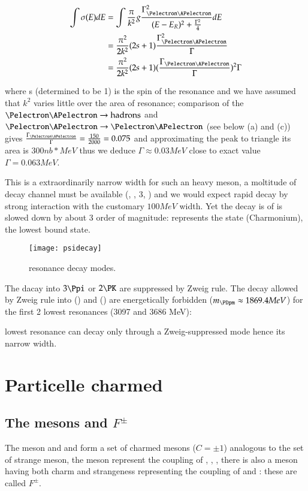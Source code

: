 \documentclass[main.tex]{subfiles}
\begin{document}
\begin{align*}
\int\sigma(E)dE&=\int\frac{\pi}{k^2}g\frac{\Gamma_{\Pelectron\APelectron}^2}{(E-E_R)^2+\frac{\Gamma^2}{4}}dE \\
&=\frac{\pi^2}{2k^2}(2s+1)\frac{\Gamma_{\Pelectron\APelectron}^2}{\Gamma}\\
&=\frac{\pi^2}{2k^2}(2s+1)(\frac{\Gamma_{\Pelectron\APelectron}}{\Gamma})^2\Gamma
\end{align*}

where s (determined to be 1) is the spin of the resonance and we have assumed that $k^2$ varies little over the area of resonance; comparison of the $\Pelectron\APelectron\rightarrow\text{hadrons}$ and $\Pelectron\APelectron\rightarrow\Pelectron\APelectron$ (see below (a) and (c)) gives $\frac{\Gamma_{\Pelectron\APelectron}}{\Gamma}=\frac{150}{2000}=0.075$ and approximating the peak to triangle its area is $300 nb*MeV$ thus  we deduce $\Gamma\approx0.03MeV$ close to exact value $\Gamma=0.063 MeV$.

This is a extraordinarily narrow width for such an heavy meson, a moltitude of decay channel must be available (\Ppiplus\Ppiminus, \PKplus\PKminus, 3\Ppi, \Pproton\APproton) and we would expect rapid decay by strong interaction with the customary $100 MeV$ width. Yet the decay is of \Ppsi is slowed down by about 3 order of magnitude: \Ppsi represents the state \Pqc\Paqc (Charmonium), the lowest bound state. 

\begin{figure}[!ht]
\centering
\texttt{[image: psidecay]}
\caption{\Ppsi resonance decay modes.}
\label{fig:psidecay}
\end{figure}

The dacay into $3\Ppi$ or $2\PK$ are suppressed by Zweig rule. The decay allowed by Zweig rule into \Pqc\APdown (\PDplus) and \Paqc\Pdown (\PDminus) are energetically forbidden ($m_{\PDpm}\approx1869.4 MeV$) for the first 2 lowest \Ppsi resonances (3097 and 3686 MeV): 

lowest resonance can decay only through a Zweig-suppressed mode hence its narrow width.

\section{Particelle charmed}

\subsection{The mesons \PD and $F^{\pm}$}\label{mesonD}
The meson \PDpm and \PDzero and \APDzero form a set of charmed mesons ($C=\pm1$) analogous to the set of strange \PK meson, the \PD meson represent the coupling of \Pup, \Pdown, \Pqc, there is also a meson having both charm and strangeness representing the coupling of \Pqc and \Pqs: these are called $F^{\pm}$.
\end{document}
